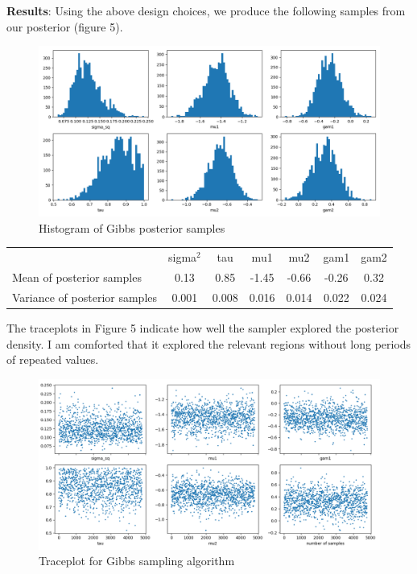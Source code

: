 \documentclass[12pt,letterpaper,twoside]{article}
\begin{document}
\textbf{Results}: Using the above design choices, we produce the following 
samples from our posterior (figure 5).
\begin{figure}[H]
    \centering
    \includegraphics[scale=0.55]{gibbs_sampled_histogram.png}
    \vspace*{-10mm}
    \caption{Histogram of Gibbs posterior samples}
\end{figure}

\begin{table}[H]
    \begin{tabular}{lcccccc}
    \multicolumn{1}{c}{}          & sigma$^2$ & tau   & mu1   & mu2   & gam1  & gam2  \\
    Mean of posterior samples     & 0.13  & 0.85  & -1.45 & -0.66 & -0.26 & 0.32  \\
    Variance of posterior samples & 0.001 & 0.008 & 0.016 & 0.014 & 0.022 & 0.024
    \end{tabular}
\end{table}

The traceplots in Figure 5 indicate how well the sampler explored the 
posterior density. I am comforted that it explored the relevant regions 
without long periods of repeated values.  
\begin{figure}[H]
    \centering
    \includegraphics[scale=0.55]{gibbs_sampled_traceplot.png}
    \vspace*{-10mm}
    \caption{Traceplot for Gibbs sampling algorithm}
\end{figure}
\end{document}
